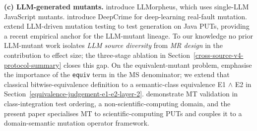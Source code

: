 \documentclass[12pt]{article}
\begin{document}
\textbf{(c) LLM-generated mutants.} \citet{tip2025llmorpheus}
introduce LLMorpheus, which uses single-LLM JavaScript mutants.
\citet{humbatova2021deepcrime} introduce DeepCrime for
deep-learning real-fault mutation. \citet{dakhel2024llm} extend
LLM-driven mutation testing to test generation on Java PUTs, providing
a recent empirical anchor for the LLM-mutant
lineage. To our knowledge no prior LLM-mutant work isolates \emph{LLM
source diversity} from \emph{MR design} in the contribution to effect
size; the three-stage ablation in Section~\ref{cross-source-v4-protocol-summary} closes this gap. On the
equivalent-mutant problem, \citet{delgadoperez2020equivalent} emphasise
the importance of the \texttt{equiv} term in the MS denominator; we
extend that classical bitwise-equivalence definition to a semantic-class
equivalence E1 $\wedge$ E2 in Section~\ref{equivalence-judgement-e1-e2-layer-2}. \citet{zhang2021classintegration} demonstrate MT
validation in class-integration test ordering, a
non-scientific-computing domain, and the present paper specialises MT to
scientific-computing PUTs and couples it to a domain-semantic mutation
operator framework.
\end{document}
